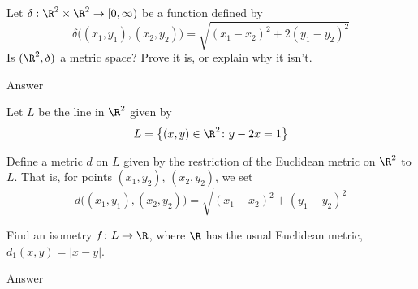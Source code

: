 \documentclass[a4paper]{article}
\begin{document}

\begin{questionbody}
Let $\delta : \R^2 \times \R^2 \to [0, \infty)$ be a function defined by \[ %
\delta\big( (x_1, y_1), (x_2, y_2) \big) = \sqrt{{(x_1 - x_2)}^2 + 2{(y_1 - y_2)}^2}
\] Is $(\R^2, \delta)$ a metric space? Prove it is, or explain why it isn't.
\end{questionbody}

Answer



\begin{questionbody}
Let $L$ be the line in $\R^2$ given by \[
L = \big\{ (x, y) \in \R^2 \colon y - 2x = 1 \big\}
\]

Define a metric $d$ on $L$ given by the restriction of the Euclidean metric on $\R^2$ to $L$. That is, for points $(x_1, y_2)$, $(x_2, y_2)$, we set \[
d\big( (x_1, y_1), (x_2, y_2) \big) = \sqrt{{(x_1 - x_2)}^2 + {(y_1 - y_2)}^2}
\]

Find an isometry $f \colon L \to \R$, where $\R$ has the usual Euclidean metric, $d_1(x, y) = |x - y|$.
\end{questionbody}

Answer

\end{document}

